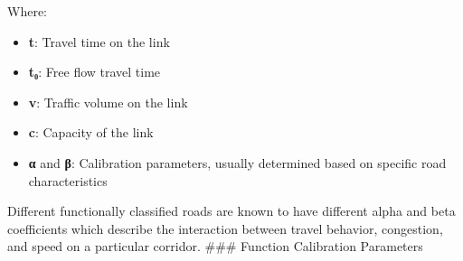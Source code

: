 \documentclass[
]{article}
\providecommand{\tightlist}{%
  \setlength{\itemsep}{0pt}\setlength{\parskip}{0pt}}
\begin{document}
Where:

\begin{itemize}
\tightlist
\item
  \textbf{t}: Travel time on the link\\
\item
  \textbf{t₀}: Free flow travel time\\
\item
  \textbf{v}: Traffic volume on the link\\
\item
  \textbf{c}: Capacity of the link\\
\item
  \textbf{α} and \textbf{β}: Calibration parameters, usually determined
  based on specific road characteristics
\end{itemize}

Different functionally classified roads are known to have different
alpha and beta coefficients which describe the interaction between
travel behavior, congestion, and speed on a particular corridor. \#\#\#
Function Calibration Parameters

\begingroup\fontsize{14}{16}\selectfont
\end{document}
